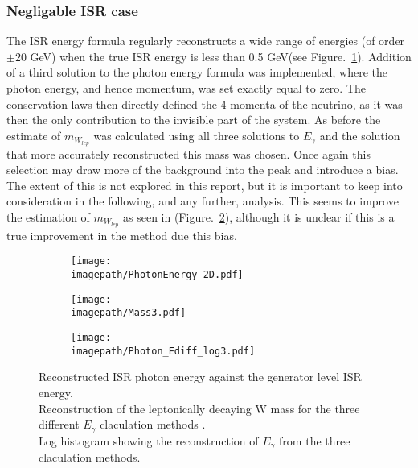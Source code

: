 \subsubsection{Negligable ISR case}
\label{SUBSUBSEC:NoISR}
The ISR energy formula regularly reconstructs a wide range of energies (of order $\pm 20$ GeV) when the true ISR energy is less than 0.5 GeV(see Figure.~\ref{SUBFIG:ZeroPhoton}). Addition of a third solution to the photon energy formula was implemented, where the photon energy, and hence momentum, was set exactly equal to zero. The conservation laws then directly defined the 4-momenta of the neutrino, as it was then the only contribution to the invisible part of the system. As before the estimate of ${m}_{W_{lep}}$ was calculated using all three solutions to $E_{\gamma}$ and the solution that more accurately reconstructed this mass was chosen. Once again this selection may draw more of the background into the peak and introduce a bias. The extent of this is not explored in this report, but it is important to keep into consideration in the following, and any further, analysis. This seems to improve the estimation of ${m}_{W_{lep}}$ as seen in (Figure.~\ref{SUBFIG:Mass3}), although it is unclear if this is a true improvement in the method due this bias.
\begin{figure}
    \begin{subfigure}[t]{0.32\textwidth}
      \centering
      \texttt{[image: \\imagepath/PhotonEnergy\_2D.pdf]}
      \caption{}
      \label{SUBFIG:ZeroPhoton}
    \end{subfigure}
    \begin{subfigure}[t]{0.32\textwidth}
      \centering
      \texttt{[image: \\imagepath/Mass3.pdf]}
      \caption{}
      \label{SUBFIG:Mass3}
    \end{subfigure}
    \begin{subfigure}[t]{0.32\textwidth}
      \centering
      \texttt{[image: \\imagepath/Photon\_Ediff\_log3.pdf]}
      \caption{}
      \label{SUBFIG:Ediff}
    \end{subfigure}
    \caption{
     Reconstructed ISR photon energy against the generator level ISR energy.\\
     Reconstruction of the leptonically decaying W mass for the three different ${E}_{\gamma}$ claculation methods .\\
     Log histogram showing the reconstruction of ${E}_{\gamma}$ from the three claculation methods.
     }
    \label{FIG:ZeroPhoton}
\end{figure}
